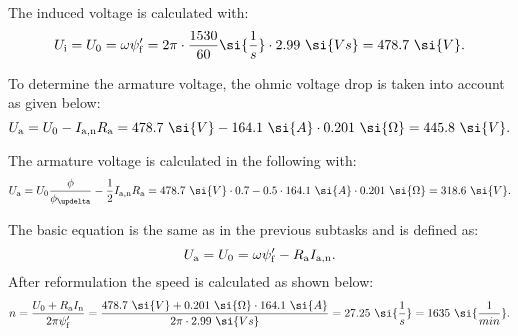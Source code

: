     
\begin{solutionblock}
    The induced voltage is calculated with:
    \begin{equation}
        \Ui = U_{\mathrm{0}}
        = \omega \psi_{\mathrm{f}}'
        = 2 \pi \cdot \frac{1530}{60} \si{\frac{1}{s}} \cdot 2.99 \ \si{Vs}
        = 478.7 \ \si{V}.
    \end{equation}

    To determine the armature voltage, the ohmic voltage drop is taken into account as given below: 
    \begin{equation}
        U_{\mathrm{a}} = U_{\mathrm{0}} - I_{\mathrm{a,n}} \Ra
        = 478.7 \ \si{V} - 164.1 \ \si{A} \cdot 0.201 \ \si{\Omega}
        = 445.8 \ \si{V}.
    \end{equation}
\end{solutionblock}




\begin{solutionblock}
    The armature voltage is calculated in the following with:
    \begin{equation}
        U_{\mathrm{a}} = U_{\mathrm{0}} \frac{\phi}{\phiDelta} - \frac{1}{2} I_{\mathrm{a,n}} \Ra
        = 478.7 \ \si{V} \cdot 0.7 - 0.5 \cdot 164.1 \ \si{A} \cdot 0.201 \ \si{\Omega}
        = 318.6 \ \si{V}.
    \end{equation}
\end{solutionblock}


\begin{solutionblock}
    The basic equation is the same as in the previous subtasks and is defined as:
    \begin{equation}
        U_{\mathrm{a}} = U_{\mathrm{0}} = \omega \psi_{\mathrm{f}}' - R_{\mathrm{a}} I_{\mathrm{a,n}}.
    \end{equation}
    After reformulation the speed is calculated as shown below:
    \begin{equation}
        n = \frac{U_{\mathrm{0}} + \Ra \In}{2 \pi \psi_{\mathrm{f}}'}
        = \frac{478.7 \ \si{V} + 0.201 \ \si{\Omega} \cdot 164.1 \ \si{A}}{2 \pi \cdot 2.99 \ \si{Vs}}
        = 27.25 \ \si{\frac{1}{s}}
        = 1635 \ \si{\frac{1}{min}}.
    \end{equation}
\end{solutionblock}

